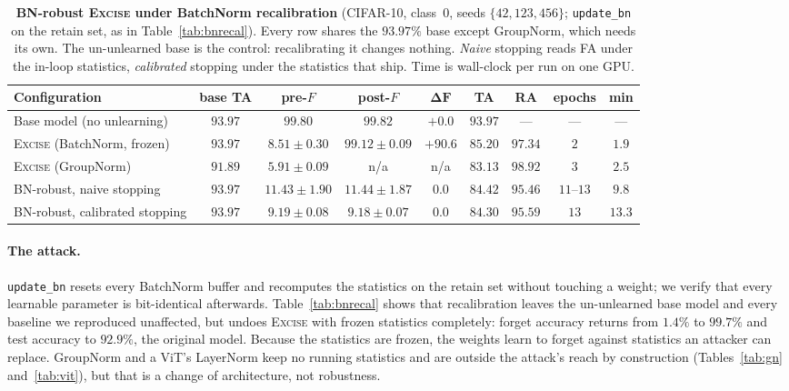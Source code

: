 \documentclass{article}
\newcommand{\ours}{\textsc{Excise}}
\newcommand{\added}[1]{{\color{revised}#1}}
\theoremstyle{remark}
\theoremstyle{plain}
\begin{document}
\begin{table}[t]
\centering\color{revised}
\caption{\added{\textbf{BN-robust \ours{} under BatchNorm recalibration} (CIFAR-10,
class~0, seeds $\{42,123,456\}$; \texttt{update\_bn} on the retain set, as in
Table~\ref{tab:bnrecal}). Every row shares the $93.97\%$ base except GroupNorm,
which needs its own. The un-unlearned base is the control: recalibrating it
changes nothing. \emph{Naive} stopping reads FA under the in-loop statistics,
\emph{calibrated} stopping under the statistics that ship. Time is wall-clock per
run on one GPU.}}
\label{tab:bnrobust}
\small
\setlength{\tabcolsep}{4pt}
\begin{tabular}{@{}lcccccccc@{}}
\toprule
Configuration & base TA & pre-$F$ & post-$F$ & $\boldsymbol{\Delta F}$ & TA & RA & epochs & min \\
\midrule
Base model (no unlearning)     & $93.97$ & $99.80$ & $99.82$ & $+0.0$ & $93.97$ & ---     & ---          & ---    \\
\ours{} (BatchNorm, frozen)    & $93.97$ & $8.51 \pm 0.30$  & $99.12 \pm 0.09$ & $\mathbf{+90.6}$ & $85.20$ & $97.34$ & $2$          & $1.9$  \\
\ours{} (GroupNorm)            & $91.89$ & $5.91 \pm 0.09$  & n/a              & n/a              & $83.13$ & $98.92$ & $3$          & $2.5$  \\
BN-robust, naive stopping      & $93.97$ & $11.43 \pm 1.90$ & $11.44 \pm 1.87$ & $\mathbf{0.0}$   & $84.42$ & $95.46$ & $11$--$13$   & $9.8$  \\
BN-robust, calibrated stopping & $93.97$ & $9.19 \pm 0.08$  & $9.18 \pm 0.07$  & $\mathbf{0.0}$   & $84.30$ & $95.59$ & $13$         & $13.3$ \\
\bottomrule
\end{tabular}
\end{table}

\paragraph{The attack.}
\texttt{update\_bn} resets every BatchNorm buffer and recomputes the statistics
on the retain set without touching a weight; we verify that every learnable
parameter is bit-identical afterwards. Table~\ref{tab:bnrecal} shows that
recalibration leaves the un-unlearned base model and every baseline we
reproduced unaffected, but undoes \ours{} with frozen statistics completely:
forget accuracy returns from $1.4\%$ to $99.7\%$ and test accuracy to $92.9\%$,
the original model. Because the statistics are frozen, the weights learn to
forget against statistics an attacker can replace. GroupNorm and a ViT's
LayerNorm keep no running statistics and are outside the attack's reach by
construction (Tables~\ref{tab:gn} and~\ref{tab:vit}), but that is a change of
architecture, not robustness.
\end{document}
